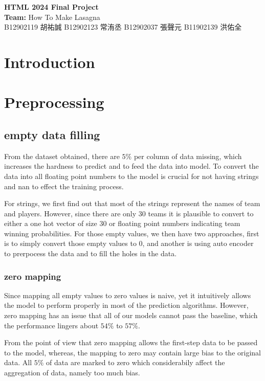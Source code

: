 \documentclass[12pt,a4paper]{article}
\begin{document}
\begin{center}
  {\LARGE \bf HTML 2024 Final Project}\\[8pt]
  \textbf{Team:} How To Make Lasagna\\
  B12902119 胡祐誠
  B12902123 常洧丞
  B12902037 張聲元
  B11902139 洪佑全
\end{center}


\section{Introduction}


\section{Preprocessing}
\subsection{empty data filling}
From the dataset obtained, there are $5\%$ per column of data missing, which increases the hardness to predict and to feed the data into model. To convert the data into all floating point numbers to the model is crucial for not having strings and nan to effect the training process.

For strings, we first find out that most of the strings represent the names of team and players.
However, since there are only $30$ teams it is plausible to convert to either a one hot vector of size $30$ or floating point numbers indicating team winning probabilities.
For those empty values, we then have two approaches, first is to simply convert those empty values to $0$, and another is using auto encoder to prerpocess the data and to fill the holes in the data.

\subsubsection{zero mapping}
Since mapping all empty values to zero values is naive, yet it intuitively allows the model to perform properly in most of the prediction algorithms.
However, zero mapping has an issue that all of our models cannot pass the baseline, which the performance lingers about $54\%$ to $57\%$.

From the point of view that zero mapping allows the first-step data to be passed to the model, whereas, the mapping to zero may contain large bias to the original data.
All $5\%$ of data are marked to zero which considerabily affect the aggregation of data, namely too much bias.
\end{document}
